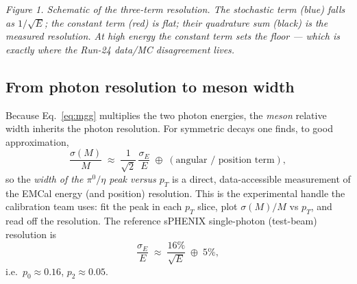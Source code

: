 \documentclass[11pt]{article}
\newcommand{\quadsum}{\;\oplus\;}
\begin{document}
\begin{center}
\end{center}
\noindent\textit{Figure 1. Schematic of the three-term resolution. The
stochastic term (blue) falls as $1/\sqrt{E}$; the constant term (red) is flat;
their quadrature sum (black) is the measured resolution. At high energy the
constant term sets the floor --- which is exactly where the Run-24 data/MC
disagreement lives.}

\subsection{From photon resolution to meson width}
Because Eq.~\eqref{eq:mgg} multiplies the two photon energies, the
\emph{meson} relative width inherits the photon resolution. For symmetric
decays one finds, to good approximation,
\begin{equation}
  \frac{\sigma(M)}{M}\;\approx\;\frac{1}{\sqrt{2}}\,\frac{\sigma_E}{E}\;
  \oplus\;(\text{angular / position term}),
\end{equation}
so the \emph{width of the $\pi^0/\eta$ peak versus $p_T$} is a direct,
data-accessible measurement of the EMCal energy (and position) resolution. This
is the experimental handle the calibration team uses: fit the peak in each $p_T$
slice, plot $\sigma(M)/M$ vs $p_T$, and read off the resolution. The reference
sPHENIX single-photon (test-beam) resolution is
\begin{equation}
  \frac{\sigma_E}{E}\;\approx\;\frac{16\%}{\sqrt{E}}\quadsum 5\%,
\end{equation}
i.e.\ $p_0\approx0.16$, $p_2\approx0.05$.
\end{document}

